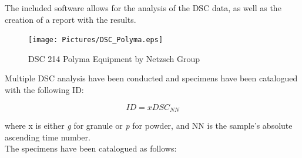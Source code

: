 \documentclass{article}
\begin{document}
                The included software allows for the analysis of the 
                DSC data, as well as the creation of a report with the results. \\ 

                    \begin{figure}[h!]
                        \centering
                        \texttt{[image: Pictures/DSC\_Polyma.eps]}
                        \caption{DSC 214 Polyma Equipment by Netzsch Group}
                        \label{fig:DSC_polyma}
                    \end{figure}

                Multiple DSC analysis have been conducted and specimens have been catalogued with the following ID: 

                \begin{equation}
                    ID = xDSC_{NN}
                    \label{eq:DSC_ID}
                \end{equation}

                where x is either \textit{g} for granule or \textit{p} for powder, and NN is the sample's absolute 
                ascending time number. \\

                The specimens have been catalogued as follows: 

                \begin{table}[h!]
                    \centering
              \caption{Selected DSC specimens representing a granule and a powder sample}
              \label{tab:DSC_ID}
              \end{table} 

              \clearpage
\end{document}
